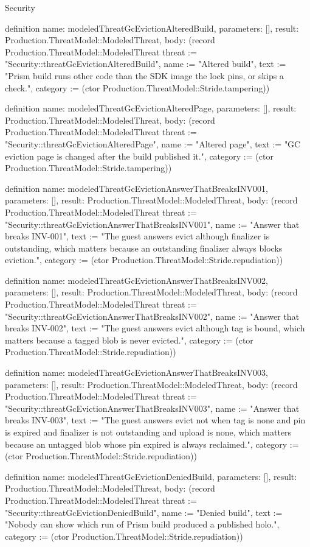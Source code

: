 \begin{lexlean}{Security}
\begin{semanticmodule}
definition{
  name: modeledThreatGcEvictionAlteredBuild,
  parameters: [],
  result: Production.ThreatModel::ModeledThreat,
  body: (record Production.ThreatModel::ModeledThreat {threat := "Security::threatGcEvictionAlteredBuild", name := "Altered build", text := "Prism build runs other code than the SDK image the lock pins, or skips a check.", category := (ctor Production.ThreatModel::Stride.tampering)})
}

definition{
  name: modeledThreatGcEvictionAlteredPage,
  parameters: [],
  result: Production.ThreatModel::ModeledThreat,
  body: (record Production.ThreatModel::ModeledThreat {threat := "Security::threatGcEvictionAlteredPage", name := "Altered page", text := "GC eviction page is changed after the build published it.", category := (ctor Production.ThreatModel::Stride.tampering)})
}

definition{
  name: modeledThreatGcEvictionAnswerThatBreaksINV001,
  parameters: [],
  result: Production.ThreatModel::ModeledThreat,
  body: (record Production.ThreatModel::ModeledThreat {threat := "Security::threatGcEvictionAnswerThatBreaksINV001", name := "Answer that breaks INV-001", text := "The guest answers evict although finalizer is outstanding, which matters because an outstanding finalizer always blocks eviction.", category := (ctor Production.ThreatModel::Stride.repudiation)})
}

definition{
  name: modeledThreatGcEvictionAnswerThatBreaksINV002,
  parameters: [],
  result: Production.ThreatModel::ModeledThreat,
  body: (record Production.ThreatModel::ModeledThreat {threat := "Security::threatGcEvictionAnswerThatBreaksINV002", name := "Answer that breaks INV-002", text := "The guest answers evict although tag is bound, which matters because a tagged blob is never evicted.", category := (ctor Production.ThreatModel::Stride.repudiation)})
}

definition{
  name: modeledThreatGcEvictionAnswerThatBreaksINV003,
  parameters: [],
  result: Production.ThreatModel::ModeledThreat,
  body: (record Production.ThreatModel::ModeledThreat {threat := "Security::threatGcEvictionAnswerThatBreaksINV003", name := "Answer that breaks INV-003", text := "The guest answers evict not when tag is none and pin is expired and finalizer is not outstanding and upload is none, which matters because an untagged blob whose pin expired is always reclaimed.", category := (ctor Production.ThreatModel::Stride.repudiation)})
}

definition{
  name: modeledThreatGcEvictionDeniedBuild,
  parameters: [],
  result: Production.ThreatModel::ModeledThreat,
  body: (record Production.ThreatModel::ModeledThreat {threat := "Security::threatGcEvictionDeniedBuild", name := "Denied build", text := "Nobody can show which run of Prism build produced a published holo.", category := (ctor Production.ThreatModel::Stride.repudiation)})
}


\end{semanticmodule}
\end{lexlean}

